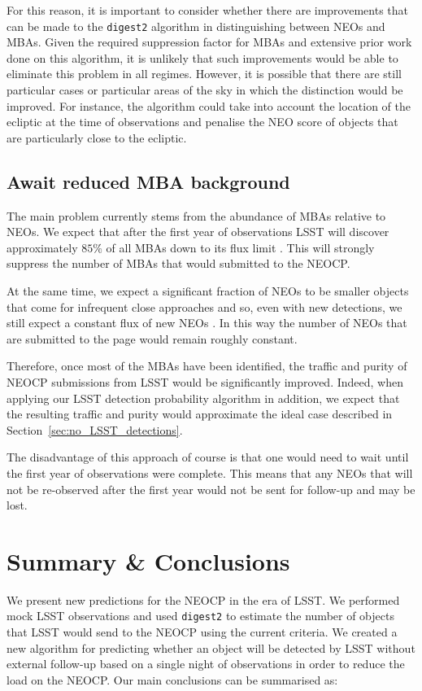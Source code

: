 \documentclass[twocolumn]{aastex631}
\newcommand{\dig}{\texttt{digest2}}
\begin{document}
For this reason, it is important to consider whether there are improvements that can be made to the \dig{} algorithm in distinguishing between NEOs and MBAs. Given the required suppression factor for MBAs and extensive prior work done on this algorithm, it is unlikely that such improvements would be able to eliminate this problem in all regimes. However, it is possible that there are still particular cases or particular areas of the sky in which the distinction would be improved. For instance, the algorithm could take into account the location of the ecliptic at the time of observations and penalise the NEO score of objects that are particularly close to the ecliptic.

\subsection{Await reduced MBA background}
The main problem currently stems from the abundance of MBAs relative to NEOs. We expect that after the first year of observations LSST will discover approximately $85\%$ of all MBAs down to its flux limit \citep{Juric+2020}. This will strongly suppress the number of MBAs that would submitted to the NEOCP.

At the same time, we expect a significant fraction of NEOs to be smaller objects that come for infrequent close approaches and so, even with new detections, we still expect a constant flux of new NEOs \citep{Juric+2020}. In this way the number of NEOs that are submitted to the page would remain roughly constant.

Therefore, once most of the MBAs have been identified, the traffic and purity of NEOCP submissions from LSST would be significantly improved. Indeed, when applying our LSST detection probability algorithm in addition, we expect that the resulting traffic and purity would approximate the ideal case described in Section~\ref{sec:no_LSST_detections}.

The disadvantage of this approach of course is that one would need to wait until the first year of observations were complete. This means that any NEOs that will not be re-observed after the first year would not be sent for follow-up and may be lost.

\section{Summary \& Conclusions} \label{sec:conclusion}
We present new predictions for the NEOCP in the era of LSST. We performed mock LSST observations and used \dig{} to estimate the number of objects that LSST would send to the NEOCP using the current criteria. We created a new algorithm for predicting whether an object will be detected by LSST without external follow-up based on a single night of observations in order to reduce the load on the NEOCP. Our main conclusions can be summarised as:
\end{document}
